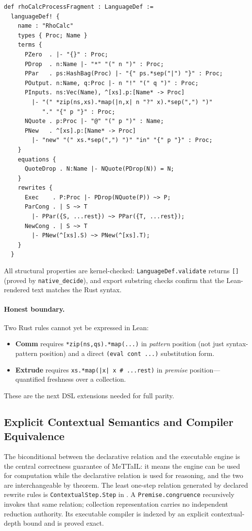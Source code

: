 \documentclass[11pt]{article}
\newcommand{\code}[1]{\texttt{#1}}
\newcommand{\codepath}[1]{\path{#1}}
\begin{document}
\begin{lstlisting}[language={},caption={RhoCalc process fragment in Lean
  \code{languageDef!} form (excerpt)}]
def rhoCalcProcessFragment : LanguageDef :=
  languageDef! {
    name : "RhoCalc"
    types { Proc; Name }
    terms {
      PZero  . |- "{}" : Proc;
      PDrop  . n:Name |- "*" "(" n ")" : Proc;
      PPar   . ps:HashBag(Proc) |- "{" ps.*sep("|") "}" : Proc;
      POutput. n:Name, q:Proc |- n "!" "(" q ")" : Proc;
      PInputs. ns:Vec(Name), ^[xs].p:[Name* -> Proc]
        |- "(" *zip(ns,xs).*map(|n,x| n "?" x).*sep(",") ")"
           "." "{" p "}" : Proc;
      NQuote . p:Proc |- "@" "(" p ")" : Name;
      PNew   . ^[xs].p:[Name* -> Proc]
        |- "new" "(" xs.*sep(",") ")" "in" "{" p "}" : Proc;
    }
    equations {
      QuoteDrop . N:Name |- NQuote(PDrop(N)) = N;
    }
    rewrites {
      Exec    . P:Proc |- PDrop(NQuote(P)) ~> P;
      ParCong . | S ~> T
        |- PPar({S, ...rest}) ~> PPar({T, ...rest});
      NewCong . | S ~> T
        |- PNew(^[xs].S) ~> PNew(^[xs].T);
    }
  }
\end{lstlisting}

All structural properties are kernel-checked: \code{LanguageDef.validate}
returns \code{[]} (proved by \code{native\_decide}), and export substring
checks confirm that the Lean-rendered text matches the Rust syntax.

\paragraph{Honest boundary.}
Two Rust rules cannot yet be expressed in Lean:
\begin{itemize}
\item \textbf{Comm} requires \code{*zip(ns,qs).*map(...)} in \emph{pattern}
  position (not just syntax-pattern position) and a direct \code{(eval cont ...)}
  substitution form.
\item \textbf{Extrude} requires \code{xs.*map(|x| x \# ...rest)} in
  \emph{premise} position---quantified freshness over a collection.
\end{itemize}
These are the next DSL extensions needed for full parity.

\subsection{Explicit Contextual Semantics and Compiler Equivalence}

The biconditional between the declarative relation and the executable engine
is the central correctness guarantee of MeTTaIL: it means the engine can be
used for computation while the declarative relation is used for reasoning,
and the two are interchangeable by theorem.
The least one-step relation generated by declared rewrite rules is
\code{ContextualStep.Step} in
\codepath{Mettapedia/OSLF/MeTTaIL/ContextualStep.lean}.  A
\code{Premise.congruence} recursively invokes that same relation; collection
representation carries no independent reduction authority.  Its executable
compiler is indexed by an explicit contextual-depth bound and is proved exact.
\end{document}
